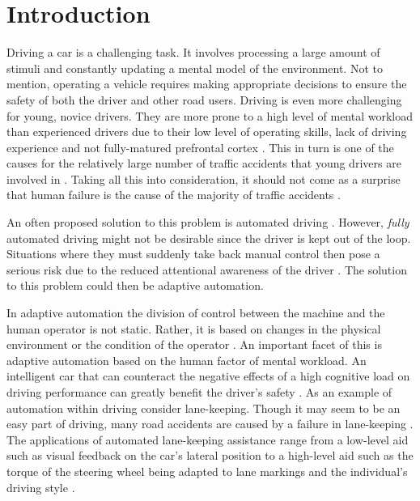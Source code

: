 
\section{Introduction}\label{sec:introduction}

Driving a car is a challenging task. 
It involves processing a large amount of stimuli and constantly updating a mental model of the environment.
Not to mention, operating a vehicle requires making appropriate decisions to ensure the safety of both the driver and other road users.
Driving is even more challenging for young, novice drivers. 
They are more prone to a high level of mental workload than experienced drivers due to their low level of operating skills, lack of driving experience \citep{Gregersen1996} and not fully-matured prefrontal cortex \citep{Ross2014}.
This in turn is one of the causes for the relatively large number of traffic accidents that young drivers are involved in \citep{Sena2013}.
Taking all this into consideration, it should not come as a surprise that human failure is the cause of the majority of traffic accidents \citep{DeWaard1996}.

An often proposed solution to this problem is automated driving \citep{Cabrall2018}.
However, \textit{fully} automated driving might not be desirable since the driver is kept out of the loop.
Situations where they must suddenly take back manual control then pose a serious risk due to the reduced attentional awareness of the driver \citep{Dijksterhuis2012}.
The solution to this problem could then be adaptive automation.

In adaptive automation the division of control between the machine and the human operator is not static.
Rather, it is based on changes in the physical environment or the condition of the operator \citep{Sheridan2011}.
An important facet of this is adaptive automation based on the human factor of mental workload.
An intelligent car that can counteract the negative effects of a high cognitive load on driving performance can greatly benefit the driver's safety \citep{Hancock1988}.
As an example of automation within driving consider lane-keeping.
Though it may seem to be an easy part of driving, many road accidents are caused by a failure in lane-keeping \citep{Dijksterhuis2012}.
The applications of automated lane-keeping assistance range from a low-level aid such as visual feedback on the car's lateral position \citep{Dijksterhuis2012} to
a high-level aid such as the torque of the steering wheel being adapted to lane markings and the individual's driving style \citep{Rath2019}.

